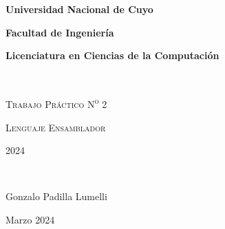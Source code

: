 {\centering
    {\bfseries\Large Universidad Nacional de Cuyo \par}
    \vspace{-0.2cm}
    {\bfseries\Large Facultad de Ingeniería \par}
    \vspace{-0.2cm}
    {\bfseries\Large Licenciatura en Ciencias de la Computación \par}
    \pagestyle{plain}
    \vfill
    \noindent\hrulefill \\
    {\scshape\Huge Trabajo Práctico N\textsuperscript{o} 2\par} %
    \vspace{0.5cm}
    {\scshape\Large Lenguaje Ensamblador \par}
    {\scshape\large  \par}
    \vspace{0.5cm}
    {\scshape\Large 2024 \par} %
    \noindent\hrulefill \\
    \vspace{4cm}
    {\Large Gonzalo Padilla Lumelli \par}
    {\large Marzo 2024 \par} %
    \vfill
    \setcounter{page}{1}
    \newpage
}